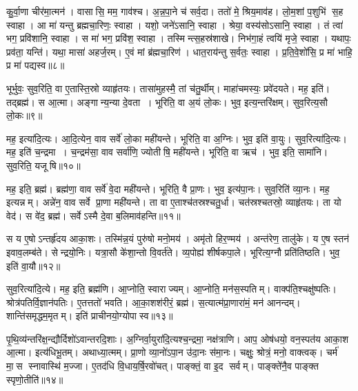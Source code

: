 कु॒र्वा॒णा चीर॑मा॒त्मन॑। वासासि॒ मम॒ गाव॑श्च। अ॒न्न॒पा॒ने च॑ सर्व॒दा। ततो॑ मे॒ श्रिय॒माव॑ह। लो॒म॒शां प॒शुभि॑ स॒ह स्वाहा। आ मा॑ यन्तु ब्रह्मचा॒रिणः॒ स्वाहा। यशो॒ जने॑ऽसानि॒ स्वाहा। श्रेया॒\an{} वस्य॑सोऽसानि॒ स्वाहा। तं त्वा॑ भग॒ प्रवि॑शानि॒ स्वाहा। स मा॑ भग॒ प्रवि॑श॒ स्वाहा। तस्मिन्त्स॒हस्र॑शाखे। निभ॑गा॒हं त्वयि॑ मृजे॒ स्वाहा। यथापः॒ प्रव॑ता॒ यन्ति॑। यथा॒ मासा॑ अहर्ज॒रम्। ए॒वं मां ब्र॑ह्मचा॒रिण॑। धात॒राय॑न्तु स॒र्वतः॒ स्वाहा। प्र॒ति॒वे॒शो॑सि॒ प्र मा॑ भाहि॒ प्र मा॑ पद्यस्व॥८॥
\anuvakamend[वि॒त॒न्वा॒ना वि॑श॒ स्वाहा॑ स॒प्त च॑]

भूर्भुवः॒ सुव॒रिति॒ वा ए॒तास्ति॒स्रो व्याहृ॑तयः। तासा॑मुहस्मै॒ तां च॑तु॒र्थीम्। माहा॑चमस्यः॒ प्रवे॑दयते। मह॒ इति॑। तद्ब्रह्म॑। स आ॒त्मा। अङ्गान्य॒न्या दे॒वता। भूरिति॒ वा अ॒यं लो॒कः। भुव॒ इत्य॒न्तरि॑क्षम्। सुव॒रित्य॒सौ लो॒कः॥९॥

मह॒ इत्या॑दि॒त्यः। आ॒दि॒त्येन॒ वाव सर्वे॑ लो॒का मही॑यन्ते। भूरिति॒ वा अ॒ग्निः। भुव॒ इति॑ वा॒युः। सुव॒रित्या॑दि॒त्यः। मह॒ इति॑ च॒न्द्रमा। च॒न्द्रम॑सा॒ वाव सर्वा॑णि॒ ज्योतीषि॒ मही॑यन्ते। भूरिति॒ वा ऋच॑। भुव॒ इति॒ सामा॑नि। सुव॒रिति॒ यजूषि॥१०॥

मह॒ इति॒ ब्रह्म॑। ब्रह्म॑णा॒ वाव सर्वे॑ वे॒दा मही॑यन्ते। भूरिति॒ वै प्रा॒णः। भुव॒ इत्य॑पा॒नः। सुव॒रिति॑ व्या॒नः। मह॒ इत्यन्नम्। अन्ने॑न॒ वाव सर्वे प्रा॒णा मही॑यन्ते। ता वा ए॒ताश्च॑तस्रश्चतु॒र्धा। चत॑स्रश्चतस्रो॒ व्याहृ॑तयः। ता यो वेद॑। स वे॑द॒ ब्रह्म॑। सर्वेऽस्मै दे॒वा ब॒लिमाव॑हन्ति॥११॥
\anuvakamend[अ॒सौ लो॒को यजूषि॒ वेद॒ द्वे च॑]

स य ए॒षोऽन्तर्\mbox{}हृ॑दय आका॒शः। तस्मि॑न्न॒यं पुरु॑षो मनो॒मय॑। अमृ॑तो हिर॒ण्मय॑। अन्त॑रेण॒ तालु॑के। य ए॒ष स्तन॑ इवाव॒लम्ब॑ते। सेन्द्रयो॒निः। यत्रा॒सौ के॑शा॒न्तो वि॒वर्त॑ते। व्य॒पोह्य॑ शीर्\mbox{}षकपा॒ले। भूरित्य॒ग्नौ प्रति॑तिष्ठति। भुव॒ इति॑ वा॒यौ॥१२॥

सुव॒रित्या॑दि॒त्ये। मह॒ इति॒ ब्रह्म॑णि। आ॒प्नोति॒ स्वाराज्यम्। आ॒प्नोति॒ मन॑स॒स्पतिम्। वाक्प॑ति॒श्चक्षु॑ष्पतिः। श्रोत्र॑पतिर्वि॒ज्ञान॑पतिः। ए॒तत्ततो॑ भवति। आ॒का॒शश॑रीरं॒ ब्रह्म॑। स॒त्यात्म॑प्रा॒णारा॑मं॒ मन॑ आनन्दम्। शान्ति॑समृद्धम॒मृतम्। इति॑ प्राचीनयो॒ग्योपास्व॥१३॥
\anuvakamend[वा॒याव॒मृत॒मेकं॑ च]

पृ॒थि॒व्य॑न्तरि॑क्ष॒न्द्यौर्दिशो॑ऽवान्तरदि॒शाः। अ॒ग्निर्वा॒युरा॑दि॒त्यश्च॒न्द्रमा॒ नक्ष॑त्राणि। आप॒ ओष॑धयो॒ वन॒स्पत॑य आका॒श आ॒त्मा। इत्य॑धिभू॒तम्। अथाध्या॒त्मम्। प्रा॒णो व्या॒नो॑ऽपा॒न उ॑दा॒नः स॑मा॒नः। चक्षुः॒ श्रोत्रं॒ मनो॒ वाक्त्वक्। चर्म॑ मा॒स स्नावास्थि॑ म॒ज्जा। ए॒तद॑धि वि॒धाय॒र्\mbox{}षि॒रवो॑चत्। पाङ्क्तं॒ वा इ॒द सर्वम्। पाङ्क्ते॑नै॒व पाङ्क्त स्पृणो॒तीति॑॥१४॥
\anuvakamend[सर्व॒मेकं॑ च]

